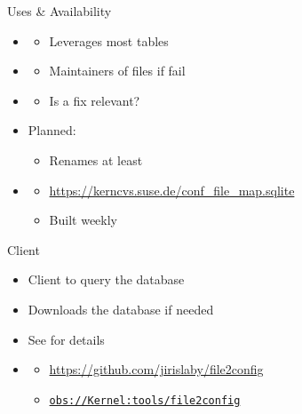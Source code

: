 \begin{frame}{}{Uses \& Availability}

  \begin{itemize}[<+->]
    \item {}
      \begin{itemize}[<.->]
	\item Leverages most tables
      \end{itemize}
    \item {}
      \begin{itemize}[<.->]
	\item Maintainers of files if  fail
      \end{itemize}
    \item {}
      \begin{itemize}[<.->]
	\item Is a fix relevant?
      \end{itemize}
    \item Planned: 
      \begin{itemize}[<.->]
	\item Renames at least
      \end{itemize}
    \item {}
      \begin{itemize}[<.->]
	\item \url{https://kerncvs.suse.de/conf_file_map.sqlite}
	\item Built weekly
      \end{itemize}
  \end{itemize}

\end{frame}

\begin{frame}{}{Client}

  \begin{itemize}[<+->]
    \item Client to query the database
    \item Downloads the database if needed
    \item See  for details
    \item {}
      \begin{itemize}[<.->]
	\item \url{https://github.com/jirislaby/file2config}
	\item \href{https://build.opensuse.org/package/show/Kernel:tools/file2config}{\nolinkurl{obs://Kernel:tools/file2config}}
      \end{itemize}
  \end{itemize}

\end{frame}

